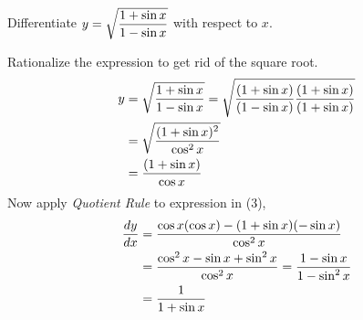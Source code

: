 

\question[3] Differentiate $y=\sqrt{\dfrac{1+\sin x}{1-\sin x}}$ 
with respect to $x$.

\watchout

\begin{solution}[\halfpage]
  Rationalize the expression to get rid of the square root.
  \begin{align}
    y&=\sqrt{\dfrac{1+\sin x}{1-\sin x}}
      =\sqrt{\dfrac{(1+\sin x)}{(1-\sin x)}
             \dfrac{(1+\sin x)}{(1+\sin x)}} \\
     &=\sqrt{\dfrac{(1+\sin x)^2}{\cos^2 x}} \\
     &=\dfrac{(1+\sin x)}{\cos x}
  \end{align}
  Now apply \textit{Quotient Rule} to expression in (3),
  \begin{align}
    \dfrac{dy}{dx}&=\dfrac{\cos x(\cos x)-(1+\sin x)(-\sin x)}
                          {\cos^2 x} \\
                  &=\dfrac{\cos^2 x -\sin x +\sin^2 x}{\cos^2 x}
                   =\dfrac{ 1-\sin x}{1-\sin^2 x} \\
                  &=\dfrac{ 1}{1+\sin x}
  \end{align}

\end{solution}
